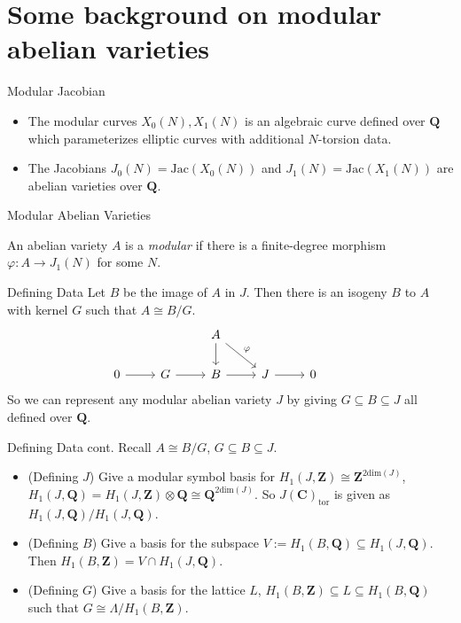 \documentclass{beamer}
\newcommand{\QQ}{\mathbf{Q}}
\newcommand{\ZZ}{\mathbf{Z}}
\newcommand{\Jac}{\mathrm{Jac}}
\renewcommand{\ZZ}{\mathbf{Z}}
\newcommand{\CC}{\mathbf{C}}
\newcommand{\tor}{\mathrm{tor}}
\begin{document}
\section{Some background on modular abelian varieties}

\begin{frame}{Modular Jacobian}
    \begin{itemize}
        \item
            The modular curves $X_0(N), X_1(N)$ is an algebraic curve defined
            over $\QQ$ which parameterizes elliptic curves with additional
            $N$-torsion data.
        \item 
            The Jacobians $J_0(N)=\Jac(X_0(N))$ and $J_1(N)=\Jac(X_1(N))$ are
            abelian varieties over $\QQ$.
    \end{itemize} 
\end{frame}

\begin{frame}{Modular Abelian Varieties}
    \begin{definition}
        An abelian variety $A$ is a \emph{modular} if there is a finite-degree
        morphism $\varphi:A\to J_1(N)$ for some $N$.
    \end{definition}
\end{frame}

\begin{frame}[fragile]{Defining Data}
Let $B$ be the image of $A$ in $J$.
Then there is an isogeny $B$ to $A$ with kernel $G$ such that $A\cong B/G$.
\begin{equation}
    \label{eq:defining_data}
    \begin{tikzcd}
        &
        &
        A \arrow[d]\arrow[dr,"\varphi"] &
        &
        &
        \\
        0 \arrow[r] &
        G \arrow[r] &
        B \arrow[r] &
        J \arrow[r] &
        0
    \end{tikzcd}
\end{equation}
So we can represent any modular abelian variety $J$ by giving $G\subseteq
B\subseteq J$ all defined over $\QQ$.
\end{frame}

\begin{frame}{Defining Data cont.}
    Recall $A\cong B/G$, $G\subseteq B \subseteq J$.
    \begin{itemize}
        \item
            (Defining $J$) Give a modular symbol basis for $H_1(J, \ZZ)\cong
            \ZZ^{2\mathrm{dim}(J)}$, $H_1(J, \QQ) = H_1(J, \ZZ)\otimes
            \QQ\cong \QQ^{2\mathrm{dim}(J)}$. So $J(\CC)_\tor$ is given as
            $H_1(J, \QQ)/H_1(J, \QQ)$.
        \item
            (Defining $B$) Give a basis for the subspace $V:=H_1(B,
            \QQ)\subseteq H_1(J, \QQ)$. Then $H_1(B, \ZZ)=V\cap H_1(J, \QQ)$.
        \item
            (Defining $G$) Give a basis for the lattice $L$, $H_1(B, \ZZ)
            \subseteq L \subseteq H_1(B, \QQ)$ such that $G\cong \Lambda/H_1(B,
            \ZZ)$.
    \end{itemize}
\end{frame}
\end{document}

